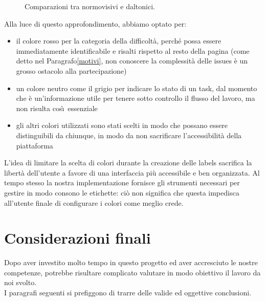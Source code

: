 \documentclass[12pt]{article} %
\begin{document}
\begin{figure}[H]
\caption{Comparazioni tra normovisivi e daltonici.}
\label{fig:daltonici}
\end{figure}

Alla luce di questo approfondimento, abbiamo optato per:
\begin{itemize}
\item il colore rosso per la categoria della difficolt\`a, perch\'e possa essere immediatamente identificabile e risalti rispetto al resto della pagina (come detto nel Paragrafo\ref{motivi}, non conoscere la complessit\`a delle issues \`e un grosso ostacolo alla partecipazione)
\item un colore neutro come il grigio per indicare lo stato di un task, dal momento che \`e un'informazione utile per tenere sotto controllo il flusso del lavoro, ma non risulta cos\`\i\ essenziale
\item gli altri colori utilizzati sono stati scelti in modo che possano essere distinguibili da chiunque, in modo da non sacrificare l'accessibilit\`a della piattaforma
\end{itemize}
L'idea di limitare la scelta di colori durante la creazione delle labels sacrifica la libert\`a dell'utente a favore di una interfaccia pi\`u accessibile e ben organizzata. Al tempo stesso la nostra implementazione fornisce gli strumenti necessari per gestire in modo consono le etichette: ci\`o non significa che questa impedisca all'utente finale di configurare i colori come meglio crede.

\newpage

\section{Considerazioni finali}
Dopo aver investito molto tempo in questo progetto ed aver accresciuto le nostre competenze, potrebbe risultare complicato valutare in modo obiettivo il lavoro da noi svolto.\\
I paragrafi seguenti si prefiggono di trarre delle valide ed oggettive conclusioni.
\end{document}
